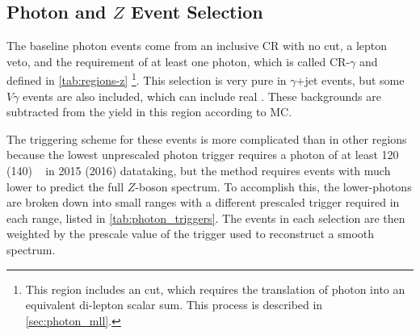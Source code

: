 \subsection{Photon and $Z$ Event Selection}
\label{sec:photon_eventsel}

The baseline photon events come from an inclusive \ac{CR} with no \met cut, a lepton veto, and the requirement of at least one photon, which is called CR-$\gamma$ and defined in \autoref{tab:regions-z} \footnote{This region includes an \HT cut, which requires the translation of photon \pt into an equivalent di-lepton \pt scalar sum. This process is described in \autoref{sec:photon_mll}.}. This selection is very pure in $\gamma$+jet events, but some $V\gamma$ events are also included, which can include real \met. These backgrounds are subtracted from the yield in this region according to \ac{MC}. 

The triggering scheme for these \gjets events is more complicated than in other regions because the lowest unprescaled photon trigger requires a photon \pt of at least 120 (140) \gev~ in 2015 (2016) datataking, but the method requires events with much lower \pt to predict the full $Z$-boson \pt spectrum. To accomplish this, the lower-\pt photons are broken down into small \pt ranges with a different prescaled trigger required in each range, listed in \autoref{tab:photon_triggers}. The events in each selection are then weighted by the prescale value of the trigger used to reconstruct a smooth \pt spectrum. 

